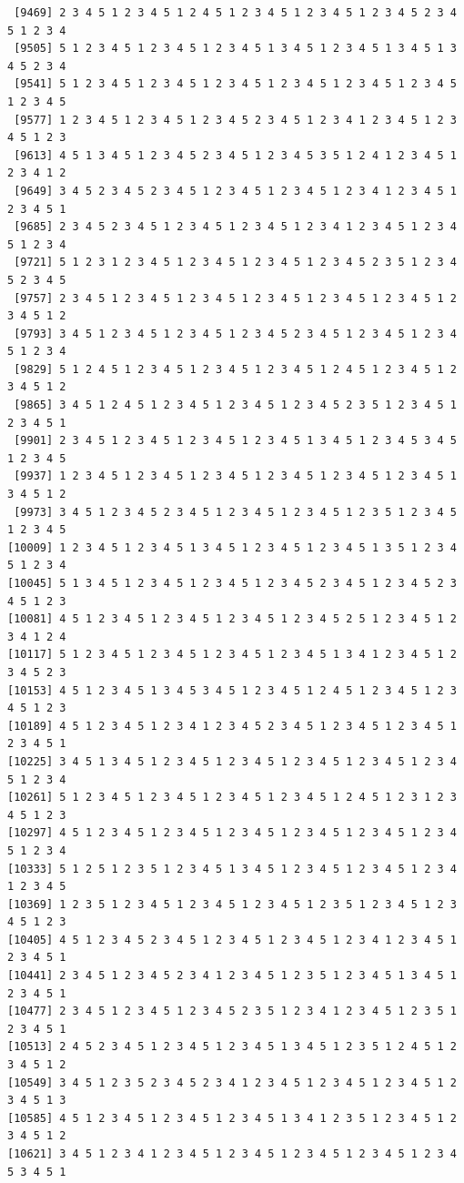 \documentclass[
  11pt,
]{book}
\begin{document}
\begin{verbatim}
 [9469] 2 3 4 5 1 2 3 4 5 1 2 4 5 1 2 3 4 5 1 2 3 4 5 1 2 3 4 5 2 3 4 5 1 2 3 4
 [9505] 5 1 2 3 4 5 1 2 3 4 5 1 2 3 4 5 1 3 4 5 1 2 3 4 5 1 3 4 5 1 3 4 5 2 3 4
 [9541] 5 1 2 3 4 5 1 2 3 4 5 1 2 3 4 5 1 2 3 4 5 1 2 3 4 5 1 2 3 4 5 1 2 3 4 5
 [9577] 1 2 3 4 5 1 2 3 4 5 1 2 3 4 5 2 3 4 5 1 2 3 4 1 2 3 4 5 1 2 3 4 5 1 2 3
 [9613] 4 5 1 3 4 5 1 2 3 4 5 2 3 4 5 1 2 3 4 5 3 5 1 2 4 1 2 3 4 5 1 2 3 4 1 2
 [9649] 3 4 5 2 3 4 5 2 3 4 5 1 2 3 4 5 1 2 3 4 5 1 2 3 4 1 2 3 4 5 1 2 3 4 5 1
 [9685] 2 3 4 5 2 3 4 5 1 2 3 4 5 1 2 3 4 5 1 2 3 4 1 2 3 4 5 1 2 3 4 5 1 2 3 4
 [9721] 5 1 2 3 1 2 3 4 5 1 2 3 4 5 1 2 3 4 5 1 2 3 4 5 2 3 5 1 2 3 4 5 2 3 4 5
 [9757] 2 3 4 5 1 2 3 4 5 1 2 3 4 5 1 2 3 4 5 1 2 3 4 5 1 2 3 4 5 1 2 3 4 5 1 2
 [9793] 3 4 5 1 2 3 4 5 1 2 3 4 5 1 2 3 4 5 2 3 4 5 1 2 3 4 5 1 2 3 4 5 1 2 3 4
 [9829] 5 1 2 4 5 1 2 3 4 5 1 2 3 4 5 1 2 3 4 5 1 2 4 5 1 2 3 4 5 1 2 3 4 5 1 2
 [9865] 3 4 5 1 2 4 5 1 2 3 4 5 1 2 3 4 5 1 2 3 4 5 2 3 5 1 2 3 4 5 1 2 3 4 5 1
 [9901] 2 3 4 5 1 2 3 4 5 1 2 3 4 5 1 2 3 4 5 1 3 4 5 1 2 3 4 5 3 4 5 1 2 3 4 5
 [9937] 1 2 3 4 5 1 2 3 4 5 1 2 3 4 5 1 2 3 4 5 1 2 3 4 5 1 2 3 4 5 1 3 4 5 1 2
 [9973] 3 4 5 1 2 3 4 5 2 3 4 5 1 2 3 4 5 1 2 3 4 5 1 2 3 5 1 2 3 4 5 1 2 3 4 5
[10009] 1 2 3 4 5 1 2 3 4 5 1 3 4 5 1 2 3 4 5 1 2 3 4 5 1 3 5 1 2 3 4 5 1 2 3 4
[10045] 5 1 3 4 5 1 2 3 4 5 1 2 3 4 5 1 2 3 4 5 2 3 4 5 1 2 3 4 5 2 3 4 5 1 2 3
[10081] 4 5 1 2 3 4 5 1 2 3 4 5 1 2 3 4 5 1 2 3 4 5 2 5 1 2 3 4 5 1 2 3 4 1 2 4
[10117] 5 1 2 3 4 5 1 2 3 4 5 1 2 3 4 5 1 2 3 4 5 1 3 4 1 2 3 4 5 1 2 3 4 5 2 3
[10153] 4 5 1 2 3 4 5 1 3 4 5 3 4 5 1 2 3 4 5 1 2 4 5 1 2 3 4 5 1 2 3 4 5 1 2 3
[10189] 4 5 1 2 3 4 5 1 2 3 4 1 2 3 4 5 2 3 4 5 1 2 3 4 5 1 2 3 4 5 1 2 3 4 5 1
[10225] 3 4 5 1 3 4 5 1 2 3 4 5 1 2 3 4 5 1 2 3 4 5 1 2 3 4 5 1 2 3 4 5 1 2 3 4
[10261] 5 1 2 3 4 5 1 2 3 4 5 1 2 3 4 5 1 2 3 4 5 1 2 4 5 1 2 3 1 2 3 4 5 1 2 3
[10297] 4 5 1 2 3 4 5 1 2 3 4 5 1 2 3 4 5 1 2 3 4 5 1 2 3 4 5 1 2 3 4 5 1 2 3 4
[10333] 5 1 2 5 1 2 3 5 1 2 3 4 5 1 3 4 5 1 2 3 4 5 1 2 3 4 5 1 2 3 4 1 2 3 4 5
[10369] 1 2 3 5 1 2 3 4 5 1 2 3 4 5 1 2 3 4 5 1 2 3 5 1 2 3 4 5 1 2 3 4 5 1 2 3
[10405] 4 5 1 2 3 4 5 2 3 4 5 1 2 3 4 5 1 2 3 4 5 1 2 3 4 1 2 3 4 5 1 2 3 4 5 1
[10441] 2 3 4 5 1 2 3 4 5 2 3 4 1 2 3 4 5 1 2 3 5 1 2 3 4 5 1 3 4 5 1 2 3 4 5 1
[10477] 2 3 4 5 1 2 3 4 5 1 2 3 4 5 2 3 5 1 2 3 4 1 2 3 4 5 1 2 3 5 1 2 3 4 5 1
[10513] 2 4 5 2 3 4 5 1 2 3 4 5 1 2 3 4 5 1 3 4 5 1 2 3 5 1 2 4 5 1 2 3 4 5 1 2
[10549] 3 4 5 1 2 3 5 2 3 4 5 2 3 4 1 2 3 4 5 1 2 3 4 5 1 2 3 4 5 1 2 3 4 5 1 3
[10585] 4 5 1 2 3 4 5 1 2 3 4 5 1 2 3 4 5 1 3 4 1 2 3 5 1 2 3 4 5 1 2 3 4 5 1 2
[10621] 3 4 5 1 2 3 4 1 2 3 4 5 1 2 3 4 5 1 2 3 4 5 1 2 3 4 5 1 2 3 4 5 3 4 5 1

\end{verbatim}
\end{document}

